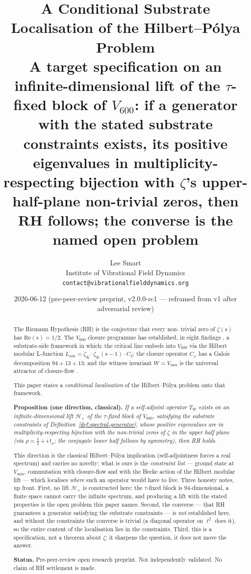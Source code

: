 \documentclass[11pt,a4paper]{article}
\title{\textbf{A Conditional Substrate Localisation of the
Hilbert--P\'olya Problem}\\[0.4em]
\large A target specification on an infinite-dimensional lift of the
$\tau$-fixed block of $V_{600}$: if a generator with the stated
substrate constraints exists, its positive eigenvalues in
multiplicity-respecting bijection with $\zeta$'s upper-half-plane
non-trivial zeros, then RH follows; the converse is the named open
problem}
\author{Lee Smart\\
\small Institute of Vibrational Field Dynamics\\
\small \texttt{contact@vibrationalfielddynamics.org}}
\date{2026-06-12 \quad (pre-peer-review preprint, v2.0.0-rc1 --- reframed from v1 after adversarial review)}
\newcommand{\Vsix}{V_{600}}
\newcommand{\Cphi}{C_\varphi}
\newcommand{\Vmin}{V_{\min}}
\newcommand{\Lsub}{L_{\mathrm{sub}}}
\newcommand{\Wit}{W}
\newcommand{\Twit}{T_W}
\begin{document}
\maketitle

\begin{abstract}
\noindent
The Riemann Hypothesis (RH) is the conjecture that every non-
trivial zero of $\zeta(s)$ has $\mathrm{Re}(s) = 1/2$. The
$\Vsix$ closure programme has established, in eight findings
\cite{criticalLinePullback}, a substrate-side framework in which:
the critical line embeds into $\Vsix$ via the Hilbert modular
L-function $\Lsub = \zeta_K \cdot \zeta_K(s-1) \cdot C_2$;
the closure operator $\Cphi$ has a Galois decomposition $94 + 13 +
13$; and the witness invariant $\Wit = \Vmin$ is the universal
attractor of closure-flow \cite{observerAttractor}.

This paper states a \emph{conditional localisation} of the
Hilbert--P\'olya problem onto that framework.

\medskip
\noindent
\textbf{Proposition (one direction, classical).}
\itshape
If a self-adjoint operator $\Twit$ exists on an
infinite-dimensional lift $\mathcal{H}_+$ of the $\tau$-fixed
block of $\Vsix$, satisfying the substrate constraints of
Definition~\ref{def:spectral-generator}, whose positive eigenvalues are in multiplicity-respecting
bijection with the non-trivial zeros of $\zeta$ in the upper half
plane (via $\rho = \tfrac12 + i\,t_\rho$; the conjugate lower
half follows by symmetry), then RH holds.

\medskip
\noindent
\upshape
This direction is the classical Hilbert--P\'olya implication
(self-adjointness forces a real spectrum) and carries no novelty;
what is ours is the \emph{constraint list} --- ground state at
$\Vmin$, commutation with closure-flow and with the Hecke action
of the Hilbert modular lift --- which localises \emph{where} such
an operator would have to live. Three honesty notes, up front.
First, no lift $\mathcal{H}_+$ is constructed here: the
$\tau$-fixed block is $94$-dimensional, a finite space cannot
carry the infinite spectrum, and producing a lift with the stated
properties is the open problem this paper names. Second, the
converse --- that RH guarantees a generator satisfying the
substrate constraints --- is \emph{not} established here, and
without the constraints the converse is trivial (a diagonal
operator on $\ell^2$ does it), so the entire content of the
localisation lies in the constraints. Third, this is a
specification, not a theorem about $\zeta$: it sharpens the
question, it does not move the answer.

\bigskip

\noindent\textbf{Status.} Pre-peer-review open research preprint.
Not independently validated. No claim of RH settlement is made.

\end{abstract}
\end{document}

